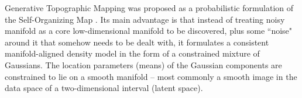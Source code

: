 

Generative Topographic Mapping \cite[GTM, ][]{Bishop1998GTMTG} was proposed as a probabilistic formulation of the Self-Organizing Map \citep{Kohonen1982}.
Its main advantage is that instead of treating noisy manifold as a core low-dimensional manifold to be discovered,
plus some ``noise" around it that somehow needs to be dealt with,
it formulates a consistent manifold-aligned density model in the form of a constrained mixture of Gaussians.
The location parameters (means) of the Gaussian components are constrained to lie on a smooth manifold
-- most commonly a smooth image in the data space of a two-dimensional interval (latent space).



